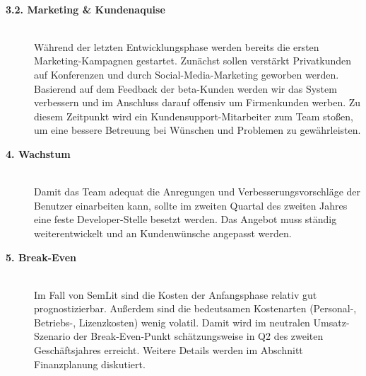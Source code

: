 \begin{description}
\\
  \item[\textbf{3.2. Marketing \& Kundenaquise}] \hfill \\
Während der letzten Entwicklungsphase werden bereits die ersten Marketing-Kampagnen gestartet. Zunächst sollen verstärkt Privatkunden auf Konferenzen und durch Social-Media-Marketing geworben werden. 
\\
Basierend auf dem Feedback der beta-Kunden werden wir das System verbessern und im Anschluss darauf offensiv um Firmenkunden werben. Zu diesem Zeitpunkt wird ein Kundensupport-Mitarbeiter zum Team stoßen, um eine bessere Betreuung bei Wünschen und Problemen zu gewährleisten.
\\
  \item[\textbf{4. Wachstum}] \hfill \\
Damit das Team adequat die Anregungen und Verbesserungsvorschläge der Benutzer einarbeiten kann, sollte im zweiten Quartal des zweiten Jahres eine feste Developer-Stelle besetzt werden. Das Angebot muss ständig weiterentwickelt und an Kundenwünsche angepasst werden.
\\
  \item[\textbf{5. Break-Even}] \hfill \\
Im Fall von SemLit sind die Kosten der Anfangsphase relativ gut prognostizierbar. Außerdem sind die bedeutsamen Kostenarten (Personal-, Betriebs-, Lizenzkosten) wenig volatil. Damit wird im neutralen Umsatz-Szenario der Break-Even-Punkt schätzungsweise in Q2 des zweiten Geschäftsjahres erreicht. Weitere Details werden im Abschnitt Finanzplanung diskutiert. 
\end{description}

